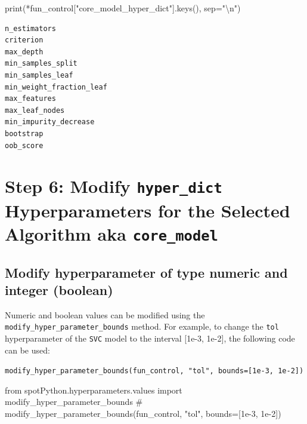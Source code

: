 \documentclass[
  letterpaper,
  DIV=11,
  numbers=noendperiod]{scrreprt}
\newenvironment{Shaded}{\begin{snugshade}}{\end{snugshade}}
\newcommand{\BuiltInTok}[1]{\textcolor[rgb]{0.00,0.23,0.31}{#1}}
\newcommand{\CharTok}[1]{\textcolor[rgb]{0.13,0.47,0.30}{#1}}
\newcommand{\CommentTok}[1]{\textcolor[rgb]{0.37,0.37,0.37}{#1}}
\newcommand{\ImportTok}[1]{\textcolor[rgb]{0.00,0.46,0.62}{#1}}
\newcommand{\NormalTok}[1]{\textcolor[rgb]{0.00,0.23,0.31}{#1}}
\newcommand{\OperatorTok}[1]{\textcolor[rgb]{0.37,0.37,0.37}{#1}}
\newcommand{\StringTok}[1]{\textcolor[rgb]{0.13,0.47,0.30}{#1}}
\begin{document}
\begin{Shaded}
\begin{Highlighting}[]
\BuiltInTok{print}\NormalTok{(}\OperatorTok{*}\NormalTok{fun\_control[}\StringTok{"core\_model\_hyper\_dict"}\NormalTok{].keys(), sep}\OperatorTok{=}\StringTok{"}\CharTok{\textbackslash{}n}\StringTok{"}\NormalTok{)}
\end{Highlighting}
\end{Shaded}

\begin{verbatim}
n_estimators
criterion
max_depth
min_samples_split
min_samples_leaf
min_weight_fraction_leaf
max_features
max_leaf_nodes
min_impurity_decrease
bootstrap
oob_score
\end{verbatim}

\hypertarget{step-6-modify-hyper_dict-hyperparameters-for-the-selected-algorithm-aka-core_model-1}{%
\section{\texorpdfstring{Step 6: Modify \texttt{hyper\_dict}
Hyperparameters for the Selected Algorithm aka
\texttt{core\_model}}{Step 6: Modify hyper\_dict Hyperparameters for the Selected Algorithm aka core\_model}}\label{step-6-modify-hyper_dict-hyperparameters-for-the-selected-algorithm-aka-core_model-1}}

\hypertarget{modify-hyperparameter-of-type-numeric-and-integer-boolean-1}{%
\subsection{Modify hyperparameter of type numeric and integer
(boolean)}\label{modify-hyperparameter-of-type-numeric-and-integer-boolean-1}}

Numeric and boolean values can be modified using the
\texttt{modify\_hyper\_parameter\_bounds} method. For example, to change
the \texttt{tol} hyperparameter of the \texttt{SVC} model to the
interval {[}1e-3, 1e-2{]}, the following code can be used:

\texttt{modify\_hyper\_parameter\_bounds(fun\_control,\ "tol",\ bounds={[}1e-3,\ 1e-2{]})}

\begin{Shaded}
\begin{Highlighting}[]
\ImportTok{from}\NormalTok{ spotPython.hyperparameters.values }\ImportTok{import}\NormalTok{ modify\_hyper\_parameter\_bounds}
\CommentTok{\# modify\_hyper\_parameter\_bounds(fun\_control, "tol", bounds=[1e{-}3, 1e{-}2])}
\end{Highlighting}
\end{Shaded}
\end{document}
